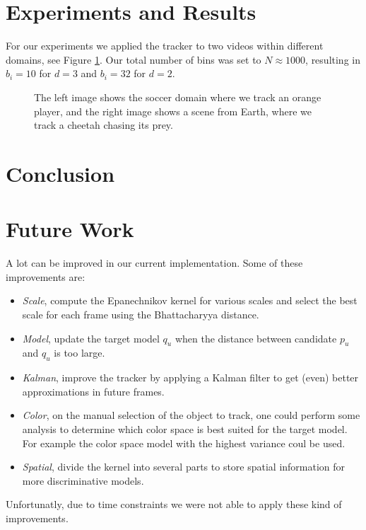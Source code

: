 \documentclass[11pt]{article}
\begin{document}
\section{Experiments and Results}
For our experiments we applied the tracker to two videos within different
domains, see Figure \ref{fig:videos}. Our total number of bins was set to $N
\approx 1000$, resulting in $b_i = 10$ for $d = 3$ and $b_i = 32$ for $d = 2$.
\begin{figure}[!ht]
\centering
\caption{The left image shows the soccer domain where we track an orange
player, and the right image shows a scene from Earth, where we track a cheetah
chasing its prey.}
\label{fig:videos}
\end{figure}



\section{Conclusion}


\section{Future Work}
A lot can be improved in our current implementation. Some of these improvements are:
\begin{itemize}
\item{\emph{Scale}, compute the Epanechnikov kernel for various scales and select the best scale for each frame using the Bhattacharyya distance.}
\item{\emph{Model}, update the target model $q_u$ when the distance between candidate $p_u$ and $q_u$ is too large.}
\item{\emph{Kalman}, improve the tracker by applying a Kalman filter to get (even) better approximations in future frames.}
\item{\emph{Color}, on the manual selection of the object to track, one could perform some analysis to determine which color space is best suited for the target model. For example the color space model with the highest variance coul be used.}
\item{\emph{Spatial}, divide the kernel into several parts to store spatial information for more discriminative models.}
\end{itemize}
Unfortunatly, due to time constraints we were not able to apply these kind of improvements.
\end{document}
